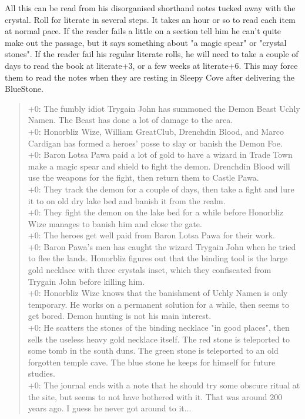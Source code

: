 \documentclass[11pt, twoside, titlepage, a4paper]{report}
\newenvironment{readoutloud}%
{\begin{quote}\begin{itshape}}%
{\end{itshape}\end{quote}}%
\begin{document}
All this can be read from his disorganised shorthand notes tucked away with the crystal. Roll for literate in several steps. It takes an hour or so to read each item at normal pace. If the reader fails a little on a section tell him he can't quite make out the passage, but it says something about "a magic spear" or "crystal stones".
If the reader fail his regular literate rolls, he will need to take a couple of days to read the book at literate+3, or a few weeks at literate+6. This may force them to read the notes when they are resting in Sleepy Cove after delivering the BlueStone.
\begin{readoutloud}
\textnormal{+0:} The fumbly idiot Trygain John has summoned the Demon Beast Uchly Namen. The Beast has done a lot of damage to the area. \\
\textnormal{+0:} Honorbliz Wize, William GreatClub, Drenchdin Blood, and Marco Cardigan has formed a heroes' posse to slay or banish the Demon Foe. \\
\textnormal{+0:} Baron Lotsa Pawa paid a lot of gold to have a wizard in Trade Town make a magic spear and shield to fight the demon. Drenchdin Blood will use the weapons for the fight, then return them to Castle Pawa. \\
\textnormal{+0:} They track the demon for a couple of days, then take a fight and lure it to on old dry lake bed and banish it from the realm. \\
\textnormal{+0:} They fight the demon on the lake bed for a while before Honorbliz Wize manages to banish him and close the gate. \\
\textnormal{+0:} The heroes get well paid from Baron Lotsa Pawa for their work.\\
\textnormal{+0:} Baron Pawa's men has caught the wizard Trygain John when he tried to flee the lands. Honorbliz figures out that the binding tool is the large gold necklace with three crystals inset, which they confiscated from Trygain John before killing him.\\
\textnormal{+0:} Honorbliz Wize knows that the banishment of Uchly Namen is only temporary. He works on a permanent solution for a while, then seems to get bored. Demon hunting is not his main interest. \\
\textnormal{+0:} He scatters the stones of the binding necklace "in good places", then sells the useless heavy gold necklace itself. The red stone is teleported to some tomb in the south duns. The green stone is teleported to an old forgotten temple cave. The blue stone he keeps for himself for future studies.\\
\textnormal{+0:} The journal ends with a note that he should try some obscure ritual at the site, but seems to not have bothered with it. That was around 200 years ago. I guess he never got around to it...
\end{readoutloud}
\end{document}
